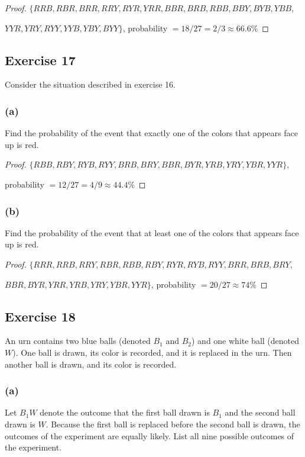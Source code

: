 \documentclass[14pt]{extarticle}
\begin{document}
\begin{proof}
     \(\{RRB, RBR, BRR, RRY, RYR, YRR, BBR, BRB, RBB, BBY, BYB, YBB,\)

     \(YYR, YRY, RYY, YYB, YBY, BYY\}\), probability \(= 18/27 = 2/3 \approx 66.6\%\)
\end{proof}

\subsection{Exercise 17}
Consider the situation described in exercise 16.

\subsubsection{(a)}
Find the probability of the event that exactly one of the colors that appears face up is red.

\begin{proof}
     \(\{RBB, RBY, RYB, RYY, BRB, BRY, BBR, BYR, YRB, YRY, YBR, YYR\}\),

     probability \(= 12/27 = 4/9 \approx 44.4\%\)
\end{proof}

\subsubsection{(b)}
Find the probability of the event that at least one of the colors that appears face up is red.

\begin{proof}
     \(\{RRR, RRB, RRY, RBR, RBB, RBY, RYR, RYB, RYY, BRR, BRB, BRY,\)

     \(BBR, BYR, YRR, YRB, YRY, YBR, YYR\}\), probability \(= 20/27 \approx 74\%\)
\end{proof}

\subsection{Exercise 18}
An urn contains two blue balls (denoted \(B_1\) and \(B_2\)) and one white ball (denoted \(W\)). One ball is
drawn, its color is recorded, and it is replaced in the urn. Then another ball is drawn, and its color is recorded.

\subsubsection{(a)}
Let \(B_1 W\) denote the outcome that the first ball drawn is \(B_1\) and the second ball drawn is \(W\). Because the
first ball is replaced before the second ball is drawn, the outcomes of the experiment are equally likely. List all
nine possible outcomes of the experiment.
\end{document}
